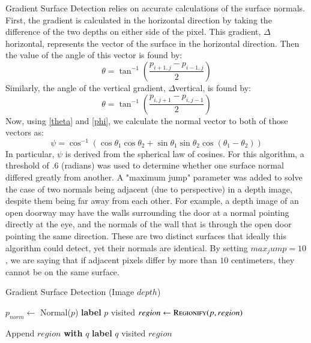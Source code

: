 Gradient Surface Detection relies on accurate calculations of the surface normals. First, the gradient is calculated in the horizontal direction by taking the difference of the two depths on either side of the pixel. This gradient, $\Delta$horizontal, represents the vector of the surface in the horizontal direction. Then the value of the angle of this vector is found by: 
\begin{equation}\label{theta}\theta = \tan^{-1}{(\frac{p_{i+1,j}-p_{i-1,j}}{2})} \end{equation}
Similarly, the angle of the vertical gradient, $\Delta$vertical, is found by:
\begin{equation}\label{phi}\theta = \tan^{-1}{(\frac{p_{i,j+1}-p_{i,j-1}}{2})} \end{equation}
Now, using \eqref{theta} and \eqref{phi}, we calculate the normal vector to both of those vectors as:
\begin{equation}\label{psi}\psi = \cos^{-1}{(\cos{\theta_1}\cos{\theta_2} + \sin{\theta_1}\sin{\theta_2}\cos{(\theta_1-\theta_2)})} \end{equation}
In particular, $\psi$ is derived from the spherical law of cosines. For this algorithm, a threshold of .6 (radians) was used to determine whether one surface normal differed greatly from another. A "maximum jump" parameter was added to solve the case of two normals being adjacent (due to perspective) in a depth image, despite them being far away from each other. For example, a depth image of an open doorway may have the walls surrounding the door at a normal pointing directly at the eye, and the normals of the wall that is through the open door pointing the same direction. These are two distinct surfaces that ideally this algorithm could detect, yet their normals are identical. By setting $max_jump =  10$, we are saying that if adjacent pixels differ by more than $10$ centimeters, they cannot be on the same surface.



\begin{algorithm}
\caption{Gradient Surface Detection (Image $depth$)}\label{gradient}
\begin{algorithmic}[1]
\State $p_{norm} \gets$ Normal($p$) 
\EndFor
{}
\State \textbf{label} $p$ visited
\State $region \gets \Call{Regionify}{p, region}$
\EndIf
\EndFor
\item[]
\State Append $region$ \textbf{with} $q$
\State \textbf{label} $q$ visited
\State {}
\EndIf
\EndFor
\State \Return $region$
\EndProcedure
\end{algorithmic}
\end{algorithm}
